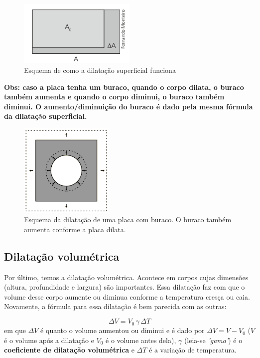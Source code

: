 \documentclass[12pt]{extarticle}
\newcommand{\<}{\langle}
\renewcommand{\>}{\rangle}
\theoremstyle{definition}
\begin{document}
\begin{figure}[H]
    \centering
    \includegraphics[width=0.5\textwidth]{dilatacao_superficial.png}
    \caption{Esquema de como a dilatação superficial funciona}
    \label{fig:dilatacao superficial}
\end{figure}

\textbf{Obs: caso a placa tenha um buraco, quando o corpo dilata, o buraco também aumenta e quando o corpo diminui, o buraco também diminui. O aumento/diminuição do buraco é dado pela mesma fórmula da dilatação superficial.}

\begin{figure}[H]
    \centering
    \includegraphics[width=0.4\textwidth]{download.png}
    \caption{Esquema da dilatação de uma placa com buraco. O buraco também aumenta conforme a placa dilata.}
    \label{fig:hole}
\end{figure}

\subsection{Dilatação volumétrica}

Por último, temos a dilatação volumétrica. Acontece em corpos cujas dimensões (altura, profundidade e largura) são importantes. Essa dilatação faz com que o volume desse corpo aumente ou diminua conforme a temperatura cresça ou caia. Novamente, a fórmula para essa dilatação é bem parecida com as outras:

\begin{equation}
    \Delta V = V_0\,\gamma\,\Delta T
\end{equation}
\noindent em que $\Delta V$ é quanto o volume aumentou ou diminui e é dado por $\Delta V = V - V_0$ ($V$ é o volume após a dilatação e $V_0$ é o volume antes dela), $\gamma$ (leia-se \textit{'gama'}) é o \textbf{coeficiente de dilatação volumétrica} e $\Delta T$ é a variação de temperatura.
\end{document}

